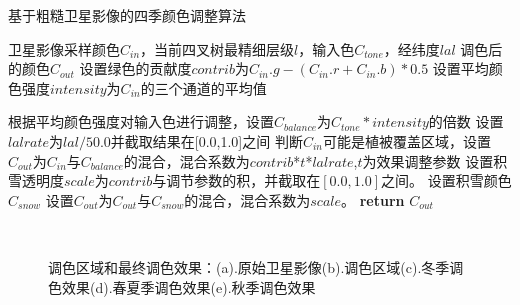 \begin{algorithm}[H]
	\renewcommand{\algorithmicrequire}{\textbf{Input:}}
	\renewcommand{\algorithmicensure}{\textbf{Output:}}
	\caption{基于粗糙卫星影像的四季颜色调整算法}
	\label{alg:1}
	\begin{algorithmic}[1]
		\REQUIRE 卫星影像采样颜色$C_{in}$，当前四叉树最精细层级$l$，输入色$C_{tone}$，经纬度$lal$
		\newpage
		\ENSURE 调色后的颜色$C_{out}$
		\STATE 设置绿色的贡献度$contrib$为$C_{in}.g-(C_{in}.r+C_{in}.b)*0.5$
		\STATE 设置平均颜色强度$intensity$为$C_{in}$的三个通道的平均值
		
		\STATE 根据平均颜色强度对输入色进行调整，设置$C_{balance}$为$C_{tone}*intensity$的倍数
		\STATE 设置$lalrate$为$lal/50.0$并截取结果在[0.0,1.0]之间
	    \STATE 判断$C_{in}$可能是植被覆盖区域，设置$C_{out}$为$C_{in}$与$C_{balance}$的混合，混合系数为$contrib$*$t$*$lalrate$,$t$为效果调整参数
		\ENDIF
		\STATE 设置积雪透明度$scale$为$contrib$与调节参数的积，并截取在$[0.0,1.0]$之间。
		\STATE 设置积雪颜色$C_{snow}$
		\STATE 设置$C_{out}$为$C_{out}$与$C_{snow}$的混合，混合系数为$scale$。
		\ENDIF
		\STATE \textbf{return} $C_{out}$
	\end{algorithmic}  
\end{algorithm}
\newpage

\newpage
\begin{figure}[H]
    \centering
     \\


    \caption{调色区域和最终调色效果：(a).原始卫星影像(b).调色区域(c).冬季调色效果(d).春夏季调色效果(e).秋季调色效果}
\end{figure}

